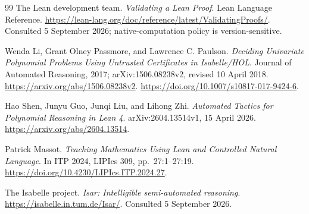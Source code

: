 \documentclass[11pt,letterpaper]{article}
\theoremstyle{definition}
\theoremstyle{remark}
\begin{document}
\begin{thebibliography}{99}
The Lean development team.
\emph{Validating a Lean Proof}. Lean Language Reference.
\url{https://lean-lang.org/doc/reference/latest/ValidatingProofs/}.
Consulted 5 September 2026; native-computation policy is version-sensitive.

Wenda Li, Grant Olney Passmore, and Lawrence C. Paulson.
\emph{Deciding Univariate Polynomial Problems Using Untrusted Certificates
in Isabelle/HOL}. Journal of Automated Reasoning, 2017;
arXiv:1506.08238v2, revised 10 April 2018.
\url{https://arxiv.org/abs/1506.08238v2}.
\url{https://doi.org/10.1007/s10817-017-9424-6}.

Hao Shen, Junyu Guo, Junqi Liu, and Lihong Zhi.
\emph{Automated Tactics for Polynomial Reasoning in Lean 4}.
arXiv:2604.13514v1, 15 April 2026.
\url{https://arxiv.org/abs/2604.13514}.

Patrick Massot.
\emph{Teaching Mathematics Using Lean and Controlled Natural Language}.
In ITP 2024, LIPIcs 309, pp.~27:1--27:19.
\url{https://doi.org/10.4230/LIPIcs.ITP.2024.27}.

The Isabelle project.
\emph{Isar: Intelligible semi-automated reasoning}.
\url{https://isabelle.in.tum.de/Isar/}.
Consulted 5 September 2026.

\end{thebibliography}
\end{document}

